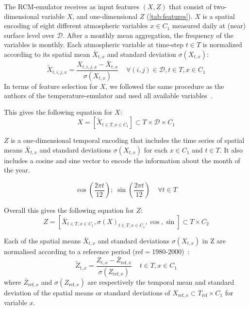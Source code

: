 \documentclass[a4paper,11pt,oneside]{report}
\begin{document}
The RCM-emulator receives as input features $(X, Z)$ that consist of two-dimensional variable $X$, and one-dimensional $Z$ (\autoref{tab:features}). $X$ is a spatial encoding of eight different atmospheric variables $x\in C_1$ measured daily at (near) surface level over $\mathcal{D}$. After a monthly mean aggregation, the frequency of the variables is monthly. Each atmospheric variable at time-step $t\in T$ is normalized according to its spatial mean $\bar{X}_{t,x}$ and standard deviation $\sigma(X_{t,x})$:
\begin{equation}\label{eq:normalisation-X}
            \tilde{X}_{t,i,j,x} = \frac{X_{t,i,j,x}-\bar{X}_{t,x}}{\sigma(X_{t,x})} \;\;\;\; \forall (i,j) \in \mathcal{D}, t\in T, x\in C_1
\end{equation}
In terms of feature selection for $X$, we followed the same procedure as the authors of the temperature-emulator and used all available variables~\cite{Doury}. 

This gives the following equation for $X$:
\begin{equation}\label{eq:X}
    X = \left[\tilde{X}_{t\in T, x\in C_1} \right] \subset T \times \mathcal{D} \times C_1
\end{equation}


$Z$ is a one-dimensional temporal encoding that includes the time series of spatial means $\bar{X}_{t,x}$ and standard deviations $\sigma(X_{t,x})$ for each $x\in C_1$ and $t\in T$. It also includes a cosine and sine vector to encode the information about the month of the year. 

\begin{equation}
       \cos\left(\frac{2\pi t}{12}\right);\; \sin\left(\frac{2\pi t}{12}\right) \;\;\;\; \forall t\in T
\end{equation}

Overall this gives the following equation for $Z$:
\begin{equation}\label{eq:Z}
    Z = \left[ \bar{X}_{t\in T, x\in C_1}, \sigma\left(X\right)_{t\in T, x\in C_1}, \cos, \sin \right] \subset T \times C_2
\end{equation}

Each of the spatial means $\bar{X}_{t,x}$ and standard deviations $\sigma(X_{t,x})$ in Z are normalised according to a reference period ($\mathrm{ref}=$1980-2000)~\cite{Doury}:
\begin{equation}\label{eq:normalisation-Z}
    \tilde{Z}_{t,x} = \frac{Z_{t,x}-\bar{Z}_{\mathrm{\mathrm{ref}},x}}{\sigma(Z_{\mathrm{ref},x})} \;\;\;\; t\in T, x\in C_1
\end{equation}
where $\bar{Z}_{\mathrm{ref},x}$ and $\sigma(Z_{\mathrm{ref},x})$ are respectively the temporal mean and standard deviation of the spatial means or standard deviations of $X_{\mathrm{ref}, x} \subset T_{\mathrm{ref}}\times C_1$ for variable $x$.
\end{document}
